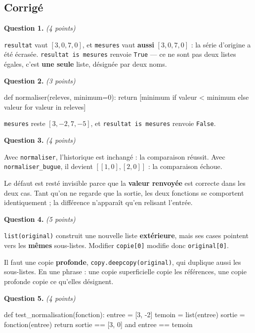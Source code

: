 \subsection*{Corrigé}

\textbf{Question 1.} \emph{(4 points)}

\lstinline{resultat} vaut $[3, 0, 7, 0]$, et \lstinline{mesures} vaut
\textbf{aussi} $[3, 0, 7, 0]$ : la série d'origine a été écrasée.
\lstinline{resultat is mesures} renvoie \lstinline{True} — ce ne sont pas deux
listes égales, c'est \textbf{une seule} liste, désignée par deux noms.

\medskip
\textbf{Question 2.} \emph{(3 points)}

\begin{python}
def normaliser(releves, minimum=0):
    return [minimum if valeur < minimum else valeur for valeur in releves]
\end{python}

\lstinline{mesures} reste $[3, -2, 7, -5]$, et
\lstinline{resultat is mesures} renvoie \lstinline{False}.

\medskip
\textbf{Question 3.} \emph{(4 points)}

Avec \lstinline{normaliser}, l'historique est inchangé : la comparaison réussit.
Avec \lstinline{normaliser_bugue}, il devient $[[1, 0], [2, 0]]$ : la
comparaison échoue.

Le défaut est resté invisible parce que la \textbf{valeur renvoyée} est
correcte dans les deux cas. Tant qu'on ne regarde que la sortie, les deux
fonctions se comportent identiquement ; la différence n'apparaît qu'en relisant
l'entrée.

\medskip
\textbf{Question 4.} \emph{(5 points)}

\lstinline{list(original)} construit une nouvelle liste \textbf{extérieure},
mais ses cases pointent vers les \textbf{mêmes} sous-listes. Modifier
\lstinline{copie[0]} modifie donc \lstinline{original[0]}.

Il faut une copie \textbf{profonde}, \lstinline{copy.deepcopy(original)}, qui
duplique aussi les sous-listes. En une phrase : une copie superficielle copie
les références, une copie profonde copie ce qu'elles désignent.

\medskip
\textbf{Question 5.} \emph{(4 points)}

\begin{python}
def test_normalisation(fonction):
    entree = [3, -2]
    temoin = list(entree)
    sortie = fonction(entree)
    return sortie == [3, 0] and entree == temoin
\end{python}

